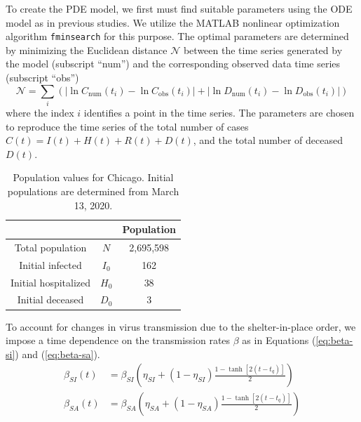 \documentclass[11pt]{article}
\begin{document}
	
	
	To create the PDE model, we first must find suitable parameters using the ODE model as in previous studies.
	We utilize the MATLAB nonlinear optimization algorithm \verb|fminsearch| for this purpose.
	The optimal parameters are determined by minimizing the Euclidean distance $\mathcal{N}$ between the time series generated by the model (subscript ``num'') and the corresponding observed data time series (subscript ``obs'')
	\begin{equation} \label{eq:objfun}
		\mathcal{N} = \sum_i \left( \left| \ln C_\mathrm{num} (t_i) - \ln C_\mathrm{obs} (t_i) \right| + \left| \ln D_\mathrm{num} (t_i) - \ln D_\mathrm{obs} (t_i) \right| \right)
	\end{equation}
	where the index $i$ identifies a point in the time series.
	The parameters are chosen to reproduce the time series of the total number of cases $C(t) = I(t) + H(t) + R(t) + D(t)$, and the total number of deceased $D(t)$.
	
	\begin{table}[h]
		\centering
		\caption{Population values for Chicago.
			Initial populations are determined from March 13, 2020.}
		\label{tab:populations}
		\begin{tabular}{ c c c }
			\hline
			\hline
			&	&	Population \\
			\hline
			Total population		&	$N$		&	2,695,598 \\
			Initial infected		&	$I_0$	&	162	\\
			Initial hospitalized	&	$H_0$	&	38 \\
			Initial deceased		&	$D_0$	&	3 \\
			\hline
			\hline
		\end{tabular}
	\end{table}

	To account for changes in virus transmission due to the shelter-in-place order, we impose a time dependence on the transmission rates $\beta$ as in Equations (\ref{eq:beta-si}) and (\ref{eq:beta-sa}).
	\begin{align}
		\label{eq:beta-si}
		\beta_{SI} (t) &= \beta_{SI} \left( \eta_{SI} + (1 - \eta_{SI}) \frac{1 - \tanh [2(t - t_q)]}{2} \right) \\
		\label{eq:beta-sa}
		\beta_{SA} (t) &= \beta_{SA} \left( \eta_{SA} + (1 - \eta_{SA}) \frac{1 - \tanh [2(t - t_q)]}{2} \right)
	\end{align}
	
\end{document}
